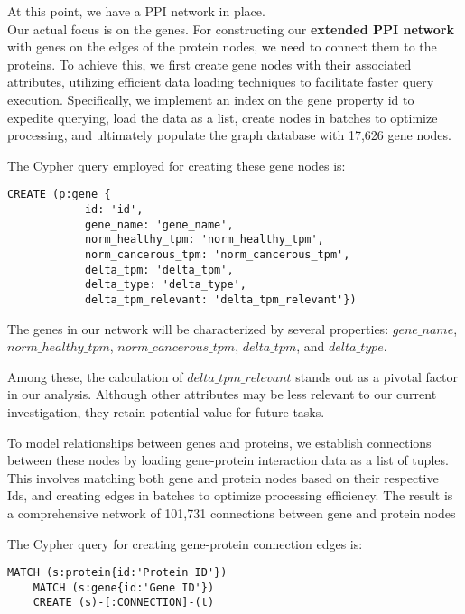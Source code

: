 At this point, we have a PPI network in place. \\


Our actual focus is on the genes.
For constructing our \textbf{extended PPI network} with genes on the edges of the protein nodes, we need to connect them to the proteins.
To achieve this, we first create gene nodes with their associated attributes,
utilizing efficient data loading techniques to facilitate faster query execution.
Specifically, we implement an index on the gene property id to expedite querying,
load the data as a list, create nodes in batches to optimize processing,
and ultimately populate the graph database with 17,626 gene nodes.

The Cypher query employed for creating these gene nodes is:
\begin{lstlisting}[language=Cypher, label={lst:gene_nodes}]
    CREATE (p:gene {
            id: 'id',
            gene_name: 'gene_name',
            norm_healthy_tpm: 'norm_healthy_tpm',
            norm_cancerous_tpm: 'norm_cancerous_tpm',
            delta_tpm: 'delta_tpm',
            delta_type: 'delta_type',
            delta_tpm_relevant: 'delta_tpm_relevant'})
\end{lstlisting}

The genes in our network will be characterized by several properties:
$gene\_name$, $norm\_healthy\_tpm$, $norm\_cancerous\_tpm$, $delta\_tpm$, and $delta\_type$.


Among these, the calculation of $delta\_tpm\_relevant$ stands out as a pivotal factor in our analysis.
Although other attributes may be less relevant to our current investigation, they retain potential value for future tasks.

To model relationships between genes and proteins,
we establish connections between these nodes by loading gene-protein interaction data as a list of tuples.
This involves matching both gene and protein nodes based on their respective Ids,
and creating edges in batches to optimize processing efficiency.
The result is a comprehensive network of 101,731 connections between gene and protein nodes

The Cypher query for creating gene-protein connection edges is:
\begin{lstlisting}[language=Cypher, label={lst:gene_protein_edges}]
    MATCH (s:protein{id:'Protein ID'})
    MATCH (s:gene{id:'Gene ID'})
    CREATE (s)-[:CONNECTION]-(t)
\end{lstlisting}

